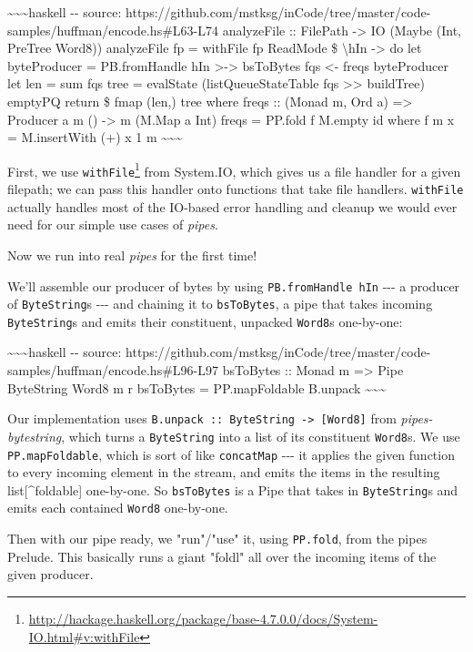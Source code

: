 \documentclass[]{article}
\renewcommand{\href}[2]{#2\footnote{\url{#1}}}
\begin{document}
\textasciitilde{}\textasciitilde{}\textasciitilde{}haskell -\/- source:
https://github.com/mstksg/inCode/tree/master/code-samples/huffman/encode.hs\#L63-L74
analyzeFile :: FilePath -\textgreater{} IO (Maybe (Int, PreTree Word8))
analyzeFile fp = withFile fp ReadMode \$ \textbackslash{}hIn -\textgreater{} do
let byteProducer = PB.fromHandle hIn \textgreater{}-\textgreater{} bsToBytes fqs
\textless{}- freqs byteProducer let len = sum fqs tree = evalState
(listQueueStateTable fqs \textgreater{}\textgreater{} buildTree) emptyPQ return
\$ fmap (len,) tree where freqs :: (Monad m, Ord a) =\textgreater{} Producer a m
() -\textgreater{} m (M.Map a Int) freqs = PP.fold f M.empty id where f m x =
M.insertWith (+) x 1 m \textasciitilde{}\textasciitilde{}\textasciitilde{}

First, we use
\href{http://hackage.haskell.org/package/base-4.7.0.0/docs/System-IO.html\#v:withFile}{\texttt{withFile}}
from System.IO, which gives us a file handler for a given filepath; we can pass
this handler onto functions that take file handlers. \texttt{withFile} actually
handles most of the IO-based error handling and cleanup we would ever need for
our simple use cases of \emph{pipes}.

Now we run into real \emph{pipes} for the first time!

We'll assemble our producer of bytes by using \texttt{PB.fromHandle\ hIn}
-\/-\/- a producer of \texttt{ByteString}s -\/-\/- and chaining it to
\texttt{bsToBytes}, a pipe that takes incoming \texttt{ByteString}s and emits
their constituent, unpacked \texttt{Word8}s one-by-one:

\textasciitilde{}\textasciitilde{}\textasciitilde{}haskell -\/- source:
https://github.com/mstksg/inCode/tree/master/code-samples/huffman/encode.hs\#L96-L97
bsToBytes :: Monad m =\textgreater{} Pipe ByteString Word8 m r bsToBytes =
PP.mapFoldable B.unpack \textasciitilde{}\textasciitilde{}\textasciitilde{}

Our implementation uses
\texttt{B.unpack\ ::\ ByteString\ -\textgreater{}\ {[}Word8{]}} from
\emph{pipes-bytestring}, which turns a \texttt{ByteString} into a list of its
constituent \texttt{Word8}s. We use \texttt{PP.mapFoldable}, which is sort of
like \texttt{concatMap} -\/-\/- it applies the given function to every incoming
element in the stream, and emits the items in the resulting
list{[}\^{}foldable{]} one-by-one. So \texttt{bsToBytes} is a Pipe that takes in
\texttt{ByteString}s and emits each contained \texttt{Word8} one-by-one.

Then with our pipe ready, we "run"/"use" it, using \texttt{PP.fold}, from the
pipes Prelude. This basically runs a giant "foldl" all over the incoming items
of the given producer.
\end{document}
